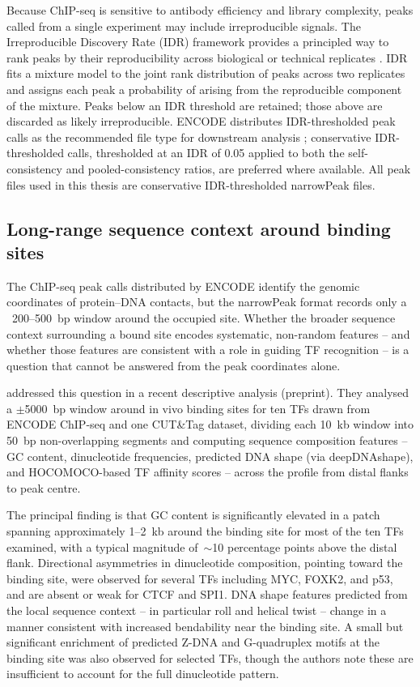 Because ChIP-seq is sensitive to antibody efficiency and library complexity, peaks called from a single experiment may include irreproducible signals.
The Irreproducible Discovery Rate (IDR) framework provides a principled way to rank peaks by their reproducibility across biological or technical replicates \cite{liMeasuringReproducibilityHighthroughput2011}.
IDR fits a mixture model to the joint rank distribution of peaks across two replicates and assigns each peak a probability of arising from the reproducible component of the mixture.
Peaks below an IDR threshold are retained; those above are discarded as likely irreproducible.
ENCODE distributes IDR-thresholded peak calls as the recommended file type for downstream analysis \cite{dunhamIntegratedEncyclopediaDNA2012};
conservative IDR-thresholded calls, thresholded at an IDR of 0.05 applied to both the self-consistency and pooled-consistency ratios, are preferred where available.
All peak files used in this thesis are conservative IDR-thresholded narrowPeak files.

\subsection{Long-range sequence context around binding sites}
\label{sec:faltejskova}

The ChIP-seq peak calls distributed by ENCODE identify the genomic coordinates of protein--DNA contacts, but the narrowPeak format records only a ~200--500~bp window around the occupied site.
Whether the broader sequence context surrounding a bound site encodes systematic, non-random features -- and whether those features are consistent with a role in guiding TF recognition -- is a question that cannot be answered from the peak coordinates alone.

\citet{faltejskovaNonconsensusFlankingSequence2026a} addressed this question in a recent descriptive analysis (preprint).
They analysed a $\pm$5000~bp window around in vivo binding sites for ten TFs drawn from ENCODE ChIP-seq and one CUT\&Tag dataset, dividing each 10~kb window into 50~bp non-overlapping segments and computing sequence composition features -- GC content, dinucleotide frequencies, predicted DNA shape (via deepDNAshape), and HOCOMOCO-based TF affinity scores -- across the profile from distal flanks to peak centre. %

The principal finding is that GC content is significantly elevated in a patch spanning approximately 1--2~kb around the binding site for most of the ten TFs examined, with a typical magnitude of~$\sim$10 percentage points above the distal flank.
Directional asymmetries in dinucleotide composition, pointing toward the binding site, were observed for several TFs including MYC, FOXK2, and p53, and are absent or weak for CTCF and SPI1.
DNA shape features predicted from the local sequence context -- in particular roll and helical twist -- change in a manner consistent with increased bendability near the binding site.
A small but significant enrichment of predicted Z-DNA and G-quadruplex motifs at the binding site was also observed for selected TFs, though the authors note these are insufficient to account for the full dinucleotide pattern.

